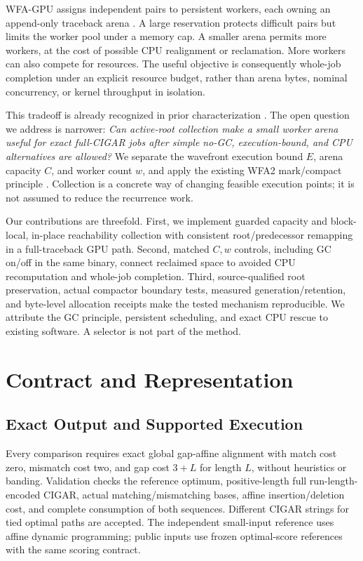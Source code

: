 \documentclass[conference,a4paper]{IEEEtran}
\begin{document}
WFA-GPU assigns independent pairs to persistent workers, each owning an append-only traceback arena \cite{wfagpu2023}. A large reservation protects difficult pairs but limits the worker pool under a memory cap. A smaller arena permits more workers, at the cost of possible CPU realignment or reclamation. More workers can also compete for resources. The useful objective is consequently whole-job completion under an explicit resource budget, rather than arena bytes, nominal concurrency, or kernel throughput in isolation.

This tradeoff is already recognized in prior characterization \cite{characterisation2026}. The open question we address is narrower: \emph{Can active-root collection make a small worker arena useful for exact full-CIGAR jobs after simple no-GC, execution-bound, and CPU alternatives are allowed?} We separate the wavefront execution bound $E$, arena capacity $C$, and worker count $w$, and apply the existing WFA2 mark/compact principle \cite{wfa2lib2026}. Collection is a concrete way of changing feasible execution points; it is not assumed to reduce the recurrence work.

Our contributions are threefold. First, we implement guarded capacity and block-local, in-place reachability collection with consistent root/predecessor remapping in a full-traceback GPU path. Second, matched $C,w$ controls, including GC on/off in the same binary, connect reclaimed space to avoided CPU recomputation and whole-job completion. Third, source-qualified root preservation, actual compactor boundary tests, measured generation/retention, and byte-level allocation receipts make the tested mechanism reproducible. We attribute the GC principle, persistent scheduling, and exact CPU rescue to existing software. A selector is not part of the method.

\section{Contract and Representation}
\subsection{Exact Output and Supported Execution}
Every comparison requires exact global gap-affine alignment with match cost zero, mismatch cost two, and gap cost $3+L$ for length $L$, without heuristics or banding. Validation checks the reference optimum, positive-length full run-length-encoded CIGAR, actual matching/mismatching bases, affine insertion/deletion cost, and complete consumption of both sequences. Different CIGAR strings for tied optimal paths are accepted. The independent small-input reference uses affine dynamic programming; public inputs use frozen optimal-score references with the same scoring contract.
\end{document}
